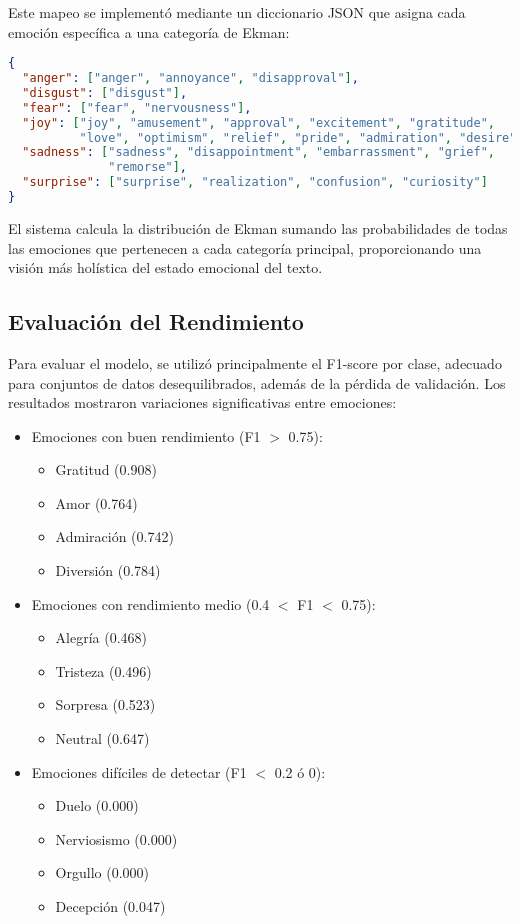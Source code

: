 \documentclass[12pt,a4paper]{report}
\begin{document}
Este mapeo se implementó mediante un diccionario JSON que asigna cada emoción específica a una categoría de Ekman:

\begin{lstlisting}[language=JSON]
{
  "anger": ["anger", "annoyance", "disapproval"],
  "disgust": ["disgust"],
  "fear": ["fear", "nervousness"],
  "joy": ["joy", "amusement", "approval", "excitement", "gratitude", 
          "love", "optimism", "relief", "pride", "admiration", "desire", "caring"],
  "sadness": ["sadness", "disappointment", "embarrassment", "grief", 
              "remorse"],
  "surprise": ["surprise", "realization", "confusion", "curiosity"]
}
\end{lstlisting}

El sistema calcula la distribución de Ekman sumando las probabilidades de todas las emociones que pertenecen a cada categoría principal, proporcionando una visión más holística del estado emocional del texto.

\subsection{Evaluación del Rendimiento}

Para evaluar el modelo, se utilizó principalmente el F1-score por clase, adecuado para conjuntos de datos desequilibrados, además de la pérdida de validación. Los resultados mostraron variaciones significativas entre emociones:

\begin{itemize}
  \item Emociones con buen rendimiento (F1 $>$ 0.75):
  \begin{itemize}
    \item Gratitud (0.908)
    \item Amor (0.764)
    \item Admiración (0.742)
    \item Diversión (0.784)
  \end{itemize}
  
  \item Emociones con rendimiento medio (0.4 $<$ F1 $<$ 0.75):
  \begin{itemize}
    \item Alegría (0.468)
    \item Tristeza (0.496)
    \item Sorpresa (0.523)
    \item Neutral (0.647)
  \end{itemize}
  
  \item Emociones difíciles de detectar (F1 $<$ 0.2 ó 0):
  \begin{itemize}
    \item Duelo (0.000)
    \item Nerviosismo (0.000)
    \item Orgullo (0.000)
    \item Decepción (0.047)
  \end{itemize}
\end{itemize}
\end{document}
